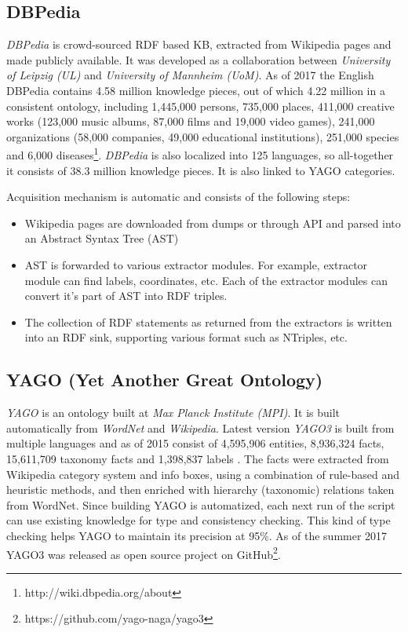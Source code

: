 \subsection{DBPedia}
\label{section:r:dbpedia}
\emph{DBPedia} is crowd-sourced RDF based KB, extracted from Wikipedia pages and made publicly available\parencite{Lehmann2015}. It was developed as a 
collaboration between \emph{University of Leipzig (UL)} and \emph{University of
Mannheim (UoM)}. As of 2017 the English DBPedia contains 4.58 million 
knowledge pieces, out of which 4.22 million in a consistent ontology, 
including 1,445,000 persons, 735,000 places, 411,000 creative works
(123,000 music albums, 87,000 films and 19,000 video games), 
241,000 organizations (58,000 companies, 49,000 educational institutions), 
251,000 species and 6,000 diseases\footnote{http://wiki.dbpedia.org/about}.
\emph{DBPedia} is also localized into 125 languages, so all-together it 
consists of 38.3 million knowledge pieces. It is also linked to YAGO categories.

Acquisition mechanism is automatic and consists of the following steps:
\begin{itemize}
\item Wikipedia pages are downloaded from dumps or through API and parsed into
an Abstract Syntax Tree (AST)
\item  AST is forwarded to various extractor modules. For example, extractor
module can find labels, coordinates, etc. Each of the extractor modules can
convert it's part of AST into RDF triples.
\item The collection of RDF statements as returned from the extractors is 
written into an RDF sink, supporting various format such as NTriples, etc.
\end{itemize}

\subsection{YAGO (Yet Another Great Ontology)}
\label{section:r:yago}
\emph{YAGO} is an ontology built at \emph{Max Planck Institute (MPI)}. It is built automatically from \emph{WordNet} and 
\emph{Wikipedia}\parencite{Suchanek2008}. Latest version \emph{YAGO3} is built
from multiple languages and as of 2015 consist of 4,595,906 entities, 
8,936,324 facts, 15,611,709 taxonomy facts and 1,398,837 labels
\parencite{Mahdisoltani2015}.
The facts were extracted from Wikipedia category system and info boxes, using
a combination of rule-based and heuristic methods, and then enriched with 
hierarchy (taxonomic) relations taken from WordNet. Since building
YAGO is automatized, each next run of the script can use existing knowledge
for type and consistency checking. This kind of type checking helps YAGO to
maintain its precision at 95\%\parencite{Suchanek2008}. As of the summer 2017
YAGO3\parencite{Rebele2016} was released as open source project on 
GitHub\footnote{https://github.com/yago-naga/yago3}.


